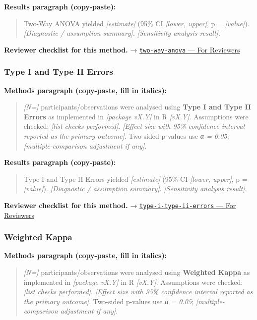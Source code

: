 \documentclass[
]{article}
\begin{document}
\textbf{Results paragraph (copy-paste):}

\begin{quote}
Two-Way ANOVA yielded \emph{{[}estimate{]}} (95\% CI \emph{{[}lower,
upper{]}}, p = \emph{{[}value{]}}). \emph{{[}Diagnostic / assumption
summary{]}}. \emph{{[}Sensitivity analysis result{]}}.
\end{quote}

\textbf{Reviewer checklist for this method.} →
\href{../chapters/04-inferential/two-way-anova.Rmd\#for-reviewers}{\texttt{two-way-anova}
--- For Reviewers}

\subsubsection{Type I and Type II
Errors}\label{type-i-and-type-ii-errors}

\textbf{Methods paragraph (copy-paste, fill in italics):}

\begin{quote}
\emph{{[}N={]}} participants/observations were analysed using
\textbf{Type I and Type II Errors} as implemented in \emph{{[}package
vX.Y{]}} in R \emph{{[}vX.Y{]}}. Assumptions were checked: \emph{{[}list
checks performed{]}}. \emph{{[}Effect size with 95\% confidence interval
reported as the primary outcome{]}}. Two-sided p-values use \emph{α =
0.05}; \emph{{[}multiple-comparison adjustment if any{]}}.
\end{quote}

\textbf{Results paragraph (copy-paste):}

\begin{quote}
Type I and Type II Errors yielded \emph{{[}estimate{]}} (95\% CI
\emph{{[}lower, upper{]}}, p = \emph{{[}value{]}}). \emph{{[}Diagnostic
/ assumption summary{]}}. \emph{{[}Sensitivity analysis result{]}}.
\end{quote}

\textbf{Reviewer checklist for this method.} →
\href{../chapters/04-inferential/type-i-type-ii-errors.Rmd\#for-reviewers}{\texttt{type-i-type-ii-errors}
--- For Reviewers}

\subsubsection{Weighted Kappa}\label{weighted-kappa}

\textbf{Methods paragraph (copy-paste, fill in italics):}

\begin{quote}
\emph{{[}N={]}} participants/observations were analysed using
\textbf{Weighted Kappa} as implemented in \emph{{[}package vX.Y{]}} in R
\emph{{[}vX.Y{]}}. Assumptions were checked: \emph{{[}list checks
performed{]}}. \emph{{[}Effect size with 95\% confidence interval
reported as the primary outcome{]}}. Two-sided p-values use \emph{α =
0.05}; \emph{{[}multiple-comparison adjustment if any{]}}.
\end{quote}
\end{document}
